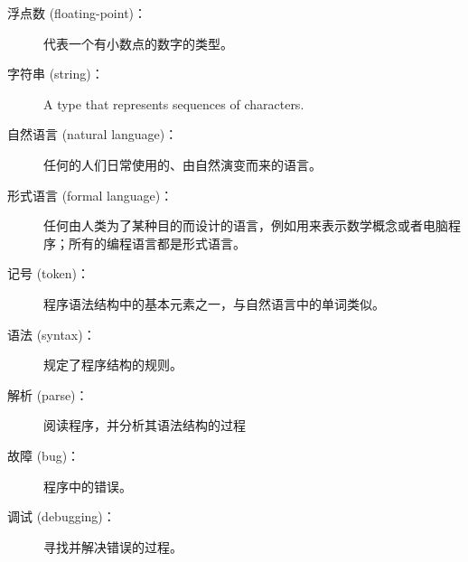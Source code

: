 \begin{description}
\item[浮点数 (floating-point)：] 代表一个有小数点的数字的类型。
  


\item[字符串 (string)：] A type that represents sequences of characters.
  


\item[自然语言 (natural language)：]  任何的人们日常使用的、由自然演变而来的语言。
  


\item[形式语言 (formal language)：]  任何由人类为了某种目的而设计的语言，例如用来表示数学概念或者电脑程序；所有的编程语言都是形式语言。
  


\item[记号 (token)：]  程序语法结构中的基本元素之一，与自然语言中的单词类似。
  


\item[语法 (syntax)：] 规定了程序结构的规则。
  


\item[解析 (parse)：] 阅读程序，并分析其语法结构的过程


\item[故障 (bug)：] 程序中的错误。


\item[调试 (debugging)：] 寻找并解决错误的过程。
  

\end{description}

